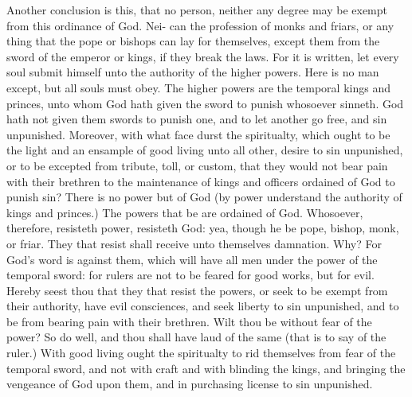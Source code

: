 Another conclusion is this, that no person, neither any 
degree may be exempt from this ordinance of God. Nei- 
can the profession of monks and friars, or any thing that 
the pope or bishops can lay for themselves, except them
from the sword of the emperor or kings, if they break 
the laws. For it is written, let every soul submit himself 
unto the authority of the higher powers. Here is no man 
except, but all souls must obey. The higher powers are 
the temporal kings and princes, unto whom God hath 
given the sword to punish whosoever sinneth. God hath 
not given them swords to punish one, and to let another 
go free, and sin unpunished. Moreover, with what face 
durst the spiritualty, which ought to be the light and an 
ensample of good living unto all other, desire to sin unpunished,
or to be excepted from tribute, toll, or custom, 
that they would not bear pain with their brethren to 
the maintenance of kings and officers ordained of God to 
punish sin? There is no power but of God (by power 
understand the authority of kings and princes.) The 
powers that be are ordained of God. Whosoever, therefore,
resisteth power, resisteth God: yea, though he be 
pope, bishop, monk, or friar. They that resist shall 
receive unto themselves damnation. Why? For God's 
word is against them, which will have all men under the 
power of the temporal sword: for rulers are not to 
be feared for good works, but for evil. Hereby seest 
thou that they that resist the powers, or seek to be exempt 
from their authority, have evil consciences, and seek liberty 
to sin unpunished, and to be from bearing pain with 
their brethren. Wilt thou be without fear of the power?
So do well, and thou shall have laud of the same (that is 
to say of the ruler.) With good living ought the spiritualty 
to rid themselves from fear of the temporal sword, and 
not with craft and with blinding the kings, and bringing the 
vengeance of God upon them, and in purchasing license 
to sin unpunished. 

